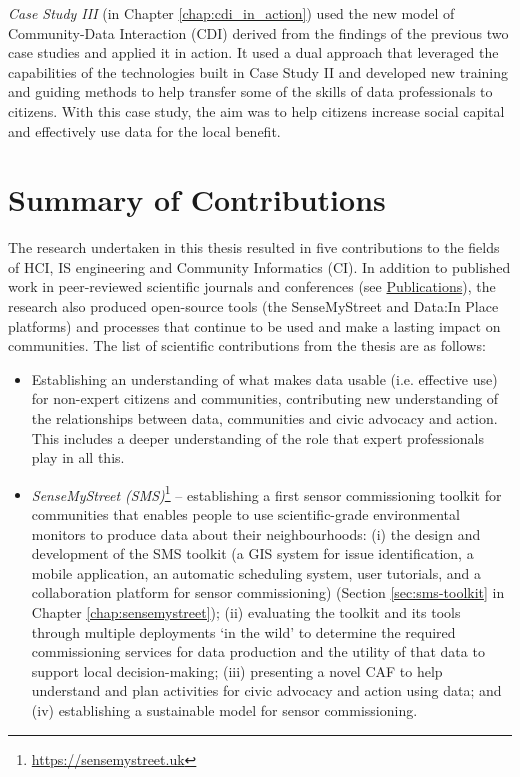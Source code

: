\begin{introduction}
\noindent
\textit{Case Study III} (in Chapter \ref{chap:cdi_in_action}) used the new model of Community-Data Interaction (CDI) derived from the findings of the previous two case studies and applied it in action. It used a dual approach that leveraged the capabilities of the technologies built in Case Study II and developed new training and guiding methods to help transfer some of the skills of data professionals to citizens. With this case study, the aim was to help citizens increase social capital and effectively use data for the local benefit. 
\clearpage

\section{Summary of Contributions}
The research undertaken in this thesis resulted in five contributions to the fields of HCI, IS engineering and Community Informatics (CI). In addition to published work in peer-reviewed scientific journals and conferences (see \hyperlink{publications}{Publications}), the research also produced open-source tools (the SenseMyStreet and Data:In Place platforms) and processes that continue to be used and make a lasting impact on communities. The list of scientific contributions from the thesis are as follows:

\begin{itemize}
\item Establishing an understanding of what makes data usable (i.e. effective use) for non-expert citizens and communities, contributing new understanding of the relationships between data, communities and civic advocacy and action. This includes a deeper understanding of the role that expert professionals play in all this.

\item\textit{SenseMyStreet (SMS)}\footnote{\url{https://sensemystreet.uk}} -- establishing a first sensor commissioning toolkit for communities that enables people to use scientific-grade environmental monitors to produce data about their neighbourhoods: (i) the design and development of the SMS toolkit (a GIS system for issue identification, a mobile application, an automatic scheduling system, user tutorials, and a collaboration platform for sensor commissioning) (Section \ref{sec:sms-toolkit} in Chapter \ref{chap:sensemystreet}); (ii) evaluating the toolkit and its tools through multiple deployments `in the wild' to determine the required commissioning services for data production and the utility of that data to support local decision-making; (iii) presenting a novel CAF to help understand and plan activities for civic advocacy and action using data; and (iv) establishing a sustainable model for sensor commissioning.


\end{itemize}
\end{introduction}
